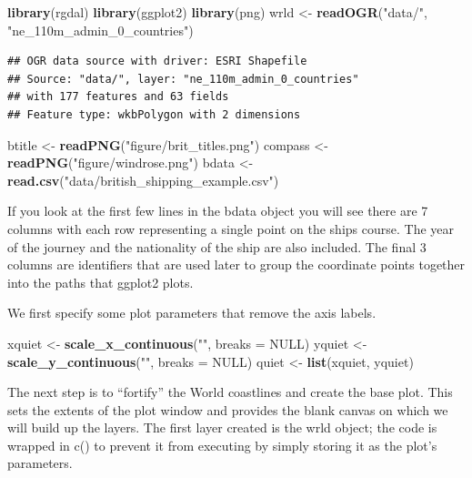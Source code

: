 \documentclass[]{article}
\newenvironment{Shaded}{}{}
\newcommand{\KeywordTok}[1]{\textcolor[rgb]{0.00,0.44,0.13}{\textbf{{#1}}}}
\newcommand{\DataTypeTok}[1]{\textcolor[rgb]{0.56,0.13,0.00}{{#1}}}
\newcommand{\StringTok}[1]{\textcolor[rgb]{0.25,0.44,0.63}{{#1}}}
\newcommand{\OtherTok}[1]{\textcolor[rgb]{0.00,0.44,0.13}{{#1}}}
\newcommand{\NormalTok}[1]{{#1}}
\begin{document}
\begin{Shaded}
\begin{Highlighting}[]
\KeywordTok{library}\NormalTok{(rgdal)}
\KeywordTok{library}\NormalTok{(ggplot2)}
\KeywordTok{library}\NormalTok{(png)}
\NormalTok{wrld <- }\KeywordTok{readOGR}\NormalTok{(}\StringTok{"data/"}\NormalTok{, }\StringTok{"ne_110m_admin_0_countries"}\NormalTok{)}
\end{Highlighting}
\end{Shaded}
\begin{verbatim}
## OGR data source with driver: ESRI Shapefile 
## Source: "data/", layer: "ne_110m_admin_0_countries"
## with 177 features and 63 fields
## Feature type: wkbPolygon with 2 dimensions
\end{verbatim}
\begin{Shaded}
\begin{Highlighting}[]
\NormalTok{btitle <- }\KeywordTok{readPNG}\NormalTok{(}\StringTok{"figure/brit_titles.png"}\NormalTok{)}
\NormalTok{compass <- }\KeywordTok{readPNG}\NormalTok{(}\StringTok{"figure/windrose.png"}\NormalTok{)}
\NormalTok{bdata <- }\KeywordTok{read.csv}\NormalTok{(}\StringTok{"data/british_shipping_example.csv"}\NormalTok{)}
\end{Highlighting}
\end{Shaded}
If you look at the first few lines in the bdata object you will see
there are 7 columns with each row representing a single point on the
ships course. The year of the journey and the nationality of the ship
are also included. The final 3 columns are identifiers that are used
later to group the coordinate points together into the paths that
ggplot2 plots.

We first specify some plot parameters that remove the axis labels.

\begin{Shaded}
\begin{Highlighting}[]
\NormalTok{xquiet <- }\KeywordTok{scale_x_continuous}\NormalTok{(}\StringTok{""}\NormalTok{, }\DataTypeTok{breaks =} \OtherTok{NULL}\NormalTok{)}
\NormalTok{yquiet <- }\KeywordTok{scale_y_continuous}\NormalTok{(}\StringTok{""}\NormalTok{, }\DataTypeTok{breaks =} \OtherTok{NULL}\NormalTok{)}
\NormalTok{quiet <- }\KeywordTok{list}\NormalTok{(xquiet, yquiet)}
\end{Highlighting}
\end{Shaded}
The next step is to ``fortify'' the World coastlines and create the base
plot. This sets the extents of the plot window and provides the blank
canvas on which we will build up the layers. The first layer created is
the wrld object; the code is wrapped in c() to prevent it from executing
by simply storing it as the plot's parameters.
\end{document}
